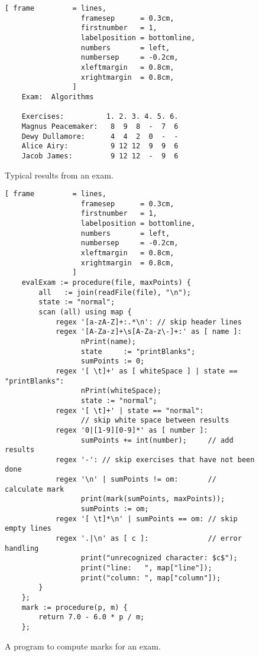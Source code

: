 \begin{figure}[!ht]
\centering
\begin{Verbatim}[ frame         = lines, 
                  framesep      = 0.3cm, 
                  firstnumber   = 1,
                  labelposition = bottomline,
                  numbers       = left,
                  numbersep     = -0.2cm,
                  xleftmargin   = 0.8cm,
                  xrightmargin  = 0.8cm,
                ]
    Exam:  Algorithms
    
    Exercises:          1. 2. 3. 4. 5. 6.
    Magnus Peacemaker:   8  9  8  -  7  6
    Dewy Dullamore:      4  4  2  0  -  -
    Alice Airy:          9 12 12  9  9  6
    Jacob James:         9 12 12  -  9  6
\end{Verbatim}
\vspace*{-0.3cm}
\caption{Typical results from an exam.}
\label{fig:result.txt}
\end{figure}


\begin{figure}[!ht]
\centering
\begin{Verbatim}[ frame         = lines, 
                  framesep      = 0.3cm, 
                  firstnumber   = 1,
                  labelposition = bottomline,
                  numbers       = left,
                  numbersep     = -0.2cm,
                  xleftmargin   = 0.8cm,
                  xrightmargin  = 0.8cm,
                ]
    evalExam := procedure(file, maxPoints) {
        all   := join(readFile(file), "\n");
        state := "normal";
        scan (all) using map {
            regex '[a-zA-Z]+:.*\n': // skip header lines
            regex '[A-Za-z]+\s[A-Za-z\-]+:' as [ name ]:
                  nPrint(name);
                  state     := "printBlanks";
                  sumPoints := 0;
            regex '[ \t]+' as [ whiteSpace ] | state == "printBlanks":
                  nPrint(whiteSpace);  
                  state := "normal";
            regex '[ \t]+' | state == "normal": 
                  // skip white space between results
            regex '0|[1-9][0-9]*' as [ number ]:
                  sumPoints += int(number);     // add results
            regex '-': // skip exercises that have not been done  
            regex '\n' | sumPoints != om:       // calculate mark
                  print(mark(sumPoints, maxPoints));
                  sumPoints := om;
            regex '[ \t]*\n' | sumPoints == om: // skip empty lines
            regex '.|\n' as [ c ]:              // error handling
                  print("unrecognized character: $c$");
                  print("line:   ", map["line"]);
                  print("column: ", map["column"]);
        }
    };
    mark := procedure(p, m) {
        return 7.0 - 6.0 * p / m;
    };    
\end{Verbatim}
\vspace*{-0.3cm}
\caption{A program to compute marks for an exam.}
\label{fig:exam.stlx}
\end{figure}

